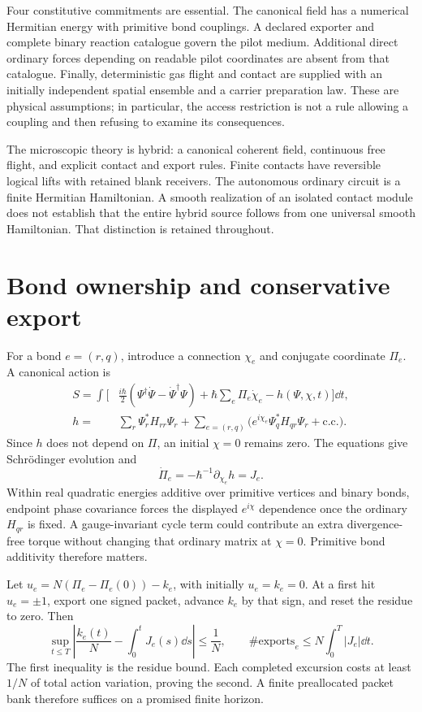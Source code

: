 Four constitutive commitments are essential. The canonical field has a numerical Hermitian energy with primitive bond couplings. A declared exporter and complete binary reaction catalogue govern the pilot medium. Additional direct ordinary forces depending on readable pilot coordinates are absent from that catalogue. Finally, deterministic gas flight and contact are supplied with an initially independent spatial ensemble and a carrier preparation law. These are physical assumptions; in particular, the access restriction is not a rule allowing a coupling and then refusing to examine its consequences.

The microscopic theory is hybrid: a canonical coherent field, continuous free flight, and explicit contact and export rules. Finite contacts have reversible logical lifts with retained blank receivers. The autonomous ordinary circuit is a finite Hermitian Hamiltonian. A smooth realization of an isolated contact module does not establish that the entire hybrid source follows from one universal smooth Hamiltonian. That distinction is retained throughout.

\section{Bond ownership and conservative export}\label{section:pilot:bond-ownership-and-conservative-export}
For a bond $e=(r,q)$, introduce a connection $\chi_e$ and conjugate coordinate $\Pi_e$. A canonical action is
\begin{align}\label{eq:pilotaction}
S=\int\bigg[&\frac{i\hbar}{2}
(\Psi^\dagger\dot\Psi-\dot\Psi^\dagger\Psi)
+\hbar\sum_e\Pi_e\dot\chi_e-h(\Psi,\chi,t)\bigg]\dd t,\\
h={}&\sum_r\Psi_r^*H_{rr}\Psi_r+
\sum_{e=(r,q)}\bigl(e^{i\chi_e}\Psi_q^*H_{qr}\Psi_r+\mathrm{c.c.}\bigr).\nonumber
\end{align}
Since $h$ does not depend on $\Pi$, an initial $\chi=0$ remains zero. The equations give Schr\"odinger evolution and
\[
\dot\Pi_e=-\hbar^{-1}\partial_{\chi_e}h=J_e.
\]
Within real quadratic energies additive over primitive vertices and binary bonds, endpoint phase covariance forces the displayed $e^{i\chi}$ dependence once the ordinary $H_{qr}$ is fixed. A gauge-invariant cycle term could contribute an extra divergence-free torque without changing that ordinary matrix at $\chi=0$. Primitive bond additivity therefore matters.

Let $u_e=N(\Pi_e-\Pi_e(0))-k_e$, with initially $u_e=k_e=0$. At a first hit $u_e=\pm1$, export one signed packet, advance $k_e$ by that sign, and reset the residue to zero. Then
\begin{equation}\label{eq:exportbound}
\sup_{t\le T}\left|\frac{k_e(t)}N-\int_0^tJ_e(s)\dd s\right|\le\frac1N,
\qquad \#\mathrm{exports}_e\le N\int_0^T|J_e|\dd t.
\end{equation}
The first inequality is the residue bound. Each completed excursion costs at least $1/N$ of total action variation, proving the second. A finite preallocated packet bank therefore suffices on a promised finite horizon.


